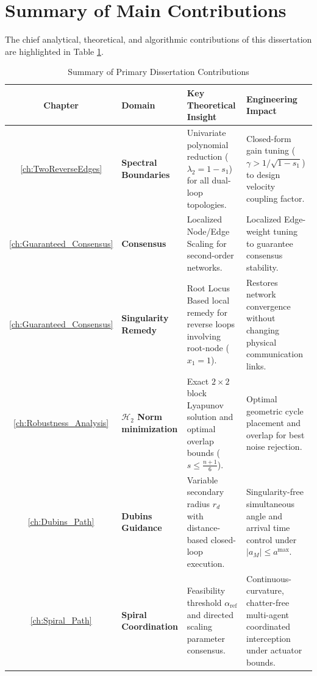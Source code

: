 \section{Summary of Main Contributions}\label{sec:ch_con_contributions}
The chief analytical, theoretical, and algorithmic contributions of this dissertation are highlighted in Table \ref{tab:ch_con_contributions_summary}.
\begin{table}[ht!]
	\centering
	\caption{Summary of Primary Dissertation Contributions}
	\label{tab:ch_con_contributions_summary}
	\small
	\begin{tabularx}{\textwidth}{@{} c l >{\RaggedRight}X >{\RaggedRight}X @{}}
		\toprule
		\textbf{Chapter} & \textbf{Domain} & \textbf{Key Theoretical Insight} & \textbf{Engineering Impact} \\
		\midrule
		\ref{ch:TwoReverseEdges} & \textbf{Spectral Boundaries} & Univariate polynomial reduction ($\lambda_2 = 1 - s_1$) for all dual-loop topologies. & Closed-form gain tuning ($\gamma > 1/\sqrt{1-s_1}$) to design velocity coupling factor. \\
		\addlinespace[0.5em]
		\ref{ch:Guaranteed_Consensus} & \textbf{Consensus} & Localized Node/Edge Scaling for second-order networks. & Localized Edge-weight tuning to guarantee consensus stability. \\
		\addlinespace[0.5em]
        \ref{ch:Guaranteed_Consensus} & \textbf{Singularity Remedy} & Root Locus Based local remedy for reverse loops involving root-node ($x_1 = 1$). & Restores network convergence without changing physical communication links. \\
		\addlinespace[0.5em]
		\ref{ch:Robustness_Analysis} & \textbf{ $\mathcal{H}_2$ Norm minimization} & Exact $2 \times 2$ block Lyapunov solution and optimal overlap bounds ($s \le \frac{n+1}{6}$). & Optimal geometric cycle placement and overlap for best noise rejection. \\
		\addlinespace[0.5em]
		\ref{ch:Dubins_Path} & \textbf{Dubins Guidance} & Variable secondary radius $r_d$ with distance-based closed-loop execution. & Singularity-free simultaneous angle and arrival time control under $|a_M| \le a^{\max}$. \\
		\addlinespace[0.5em]
		\ref{ch:Spiral_Path} & \textbf{Spiral Coordination} & Feasibility threshold $\alpha_{\text{ref}}$ and directed scaling parameter consensus. & Continuous-curvature, chatter-free multi-agent coordinated interception under actuator bounds. \\
		\bottomrule
	\end{tabularx}
\end{table}
